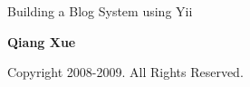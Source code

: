 
\thispagestyle{empty}
\begin{center}
    \bfseries \rule{0cm}{1.5cm} \Huge
    Building a Blog System using Yii
     \vspace{1.5cm}
\end{center}

\begin{center}
    \bfseries \Large Qiang Xue
\end{center}


\begin{center}
   Copyright 2008-2009. All Rights Reserved.
\end{center}

\vfill

\pagebreak \thispagestyle{empty} \cleardoublepage

